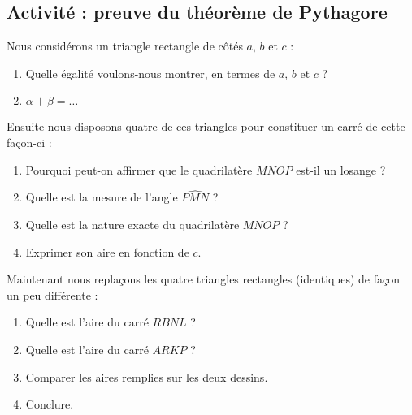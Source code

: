 
\subsection*{Activité : preuve du théorème de Pythagore}

Nous considérons un triangle rectangle de côtés \( a\), \( b\) et \( c\) :
\begin{center}
   
\end{center}

\begin{enumerate}
    \item
        Quelle égalité voulons-nous montrer, en termes de \( a\), \( b\) et \( c\) ?
    \item
        \( \alpha+\beta=\ldots\)
\end{enumerate}

Ensuite nous disposons quatre de ces triangles pour constituer un carré de cette façon-ci :
\begin{center}
   
\end{center}

\begin{enumerate}
    \item
        Pourquoi peut-on affirmer que le quadrilatère \( MNOP\) est-il un losange ?
    \item
        Quelle est la mesure de l'angle $\widehat{PMN}$ ?
    \item
        Quelle est la nature exacte du quadrilatère \( MNOP\) ?
    \item
        Exprimer son aire en fonction de \( c\).
\end{enumerate}

Maintenant nous replaçons les quatre triangles rectangles (identiques) de façon un peu différente :

\begin{center}
   
\end{center}

\begin{enumerate}
    \item
        Quelle est l'aire du carré \( RBNL\) ?
    \item
        Quelle est l'aire du carré \( ARKP\) ?
    \item
        Comparer les aires remplies sur les deux dessins.
    \item
        Conclure.
\end{enumerate}


